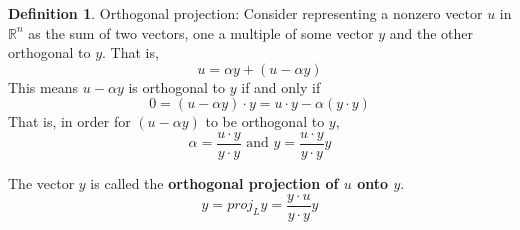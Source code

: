 \documentclass[letterpaper]{article}
\theoremstyle{definition}
\newtheorem{definition}{Definition}[section]
\begin{document}
\begin{definition}{Orthogonal projection: }
Consider representing a nonzero vector $u$ in $\mathbb{R}^n$ as the sum of two vectors, one a multiple of some vector $y$ and the other orthogonal to $y$. That is, 
$$u = \alpha y + (u - \alpha y)$$
This means $u - \alpha y$ is orthogonal to $y$ if and only if 
$$ 0 = (u - \alpha y) \cdot y = u \cdot y - \alpha (y \cdot y)$$
That is, in order for $(u - \alpha y)$ to be orthogonal to $y$, 
$$\alpha = \frac{u \cdot y}{y \cdot y} \text{ and } y = \frac{u \cdot y}{y \cdot y} y$$

The vector $y$ is called the \textbf{orthogonal projection of $u$ onto $y$}. 
$$ y = proj_{L} y = \frac{y \cdot u}{y \cdot y} y$$
\end{definition}
\end{document}
